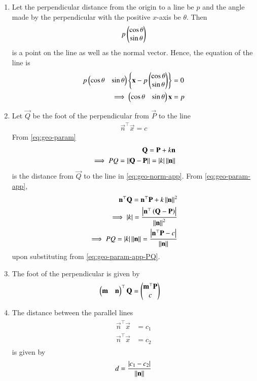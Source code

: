 \begin{enumerate}[label=\thesubsubsection.\arabic*.,ref=\thesubsubsection.\theenumi]
\item Let the perpendicular distance from the origin to a line be $p$ and the angle made by the perpendicular with the positive $x$-axis be $\theta$.
	Then 
\begin{align}
	p\begin{pmatrix}\cos \theta \\ \sin \theta\end{pmatrix}
\end{align}
is a point on the line as well as the normal vector.
Hence, the equation of the line is 
\begin{align}
	p\begin{pmatrix}\cos \theta & \sin \theta\end{pmatrix}
	\left\{\mathbf{x}-p\begin{pmatrix}\cos \theta \\ \sin \theta\end{pmatrix}\right\} &= 0
	\\
	\implies 
	\begin{pmatrix}\cos \theta & \sin \theta\end{pmatrix}
	\mathbf{x} &= p
\label{eq:chapters/11/10/2/8-final}
\end{align}
\item Let $\vec{Q}$ be the foot of the perpendicular from $\vec{P}$
	to the line
\begin{align}
			\label{eq:geo-norm-app}
    \vec{n}^{\top}  \vec{x} = c
\end{align}
From
			\eqref{eq:geo-param}
\begin{align}
			\label{eq:geo-param-app}
	\mathbf{Q} = \mathbf{P} + k\mathbf{n}
	\\
	\implies PQ = \left\lVert\mathbf{Q} - \mathbf{P}\right\rVert=\left\vert k\right\vert \left\lVert\mathbf{n}\right\rVert
			\label{eq:geo-param-app-PQ}
\end{align}
is the distance from $\vec{Q}$
to the line in 
			\eqref{eq:geo-norm-app}.
			From \eqref{eq:geo-param-app},
\begin{align}
	\mathbf{n}^{\top}  \mathbf{Q} = \mathbf{n}^{\top}  \mathbf{P} + k\left\lVert\mathbf{n}\right\rVert^2
	\\
	\implies \left\vert k\right\vert = 
	\frac{\left\vert\mathbf{n}^{\top}\left(\mathbf{Q} - \mathbf{P}\right)\right\vert}{\left\lVert\mathbf{n}\right\rVert^2}
			\label{eq:geo-param-app-k}
			\\
	\implies PQ =\left\vert k\right\vert  
		\left\lVert\mathbf{n}\right\rVert	=
	\frac{\left\vert\mathbf{n}^{\top}\mathbf{P} - c\right\vert}{\left\lVert\mathbf{n}\right\rVert}
			\label{eq:PQ-final}
\end{align}
upon substituting from 
			\eqref{eq:geo-param-app-PQ}.
\item The foot of the perpendicular is given by
\begin{align}
	\label{eq:11/10/3/4/foot_of_perpendicular}
	\begin{pmatrix}\mathbf{m} & \mathbf{n}\end{pmatrix}^\top\mathbf{Q} &= 
	   \begin{pmatrix}
              \mathbf{m}^\top\mathbf{P}\\
	      c
	      \end{pmatrix}
\end{align}
\item The distance between the parallel lines 
\begin{align}
	\label{eq:parallel_lines}
	\begin{split}
		\vec{n}^{\top}\vec{x} &= c_1
		\\
		\vec{n}^{\top}\vec{x} &= c_2
	\end{split}
\end{align}
is given by 
\begin{align}
	\label{eq:dist_lines_2d}
	d = \frac{\left\vert   c_1-c_2 \right\vert}{\left\lVert\mathbf{n}\right\rVert}	
\end{align}
\end{enumerate}
